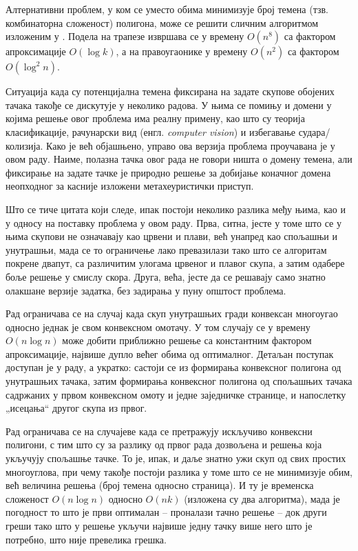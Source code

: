 \documentclass[a4paper]{article}
\begin{document}
Алтернативни проблем, у ком се уместо обима минимизује број темена (тзв. комбинаторна сложеност) полигона, може се решити сличним алгоритмом изложеним у \cite{mitch}. Подела на трапезе извршава се у времену $O(n^8)$ са фактором апроксимације $O(\log k)$, а на правоугаонике у времену $O(n^2)$ са фактором $O(\log^2n)$.

Ситуација када су потенцијална темена фиксирана на задате скупове обојених тачака такође се дискутује у неколико радова. У њима се помињу и домени у којима решење овог проблема има реалну примену, као што су теорија класификације, рачунарски вид (енгл. \textit{computer vision}) и избегавање судара/колизија. Како је већ објашњено, управо ова верзија проблема проучавана је у овом раду. Наиме, полазна тачка овог рада \cite{csc} не говори ништа о домену темена, али фиксирање на задате тачке је природно решење за добијање коначног домена неопходног за касније изложени метахеуристички приступ.

Што се тиче цитата који следе, ипак постоји неколико разлика међу њима, као и у односу на поставку проблема у овом раду. Прва, ситна, јесте у томе што се у њима скупови не означавају као црвени и плави, већ унапред као спољашњи и унутрашњи, мада се то ограничење лако превазилази тако што се алгоритам покрене двапут, са различитим улогама црвеног и плавог скупа, а затим одабере боље решење у смислу скора. Друга, већа, јесте да се решавају само знатно олакшане верзије задатка, без задирања у пуну општост проблема.

Рад \cite{eades} ограничава се на случај када скуп унутрашњих гради конвексан многоугао односно једнак је свом конвексном омотачу. У том случају се у времену $O(n\log n)$ може добити приближно решење са константним фактором апроксимације, највише дупло већег обима од оптималног. Детаљан поступак доступан је у раду, а укратко: састоји се из формирања конвексног полигона од унутрашњих тачака, затим формирања конвексног полигона од спољашњих тачака садржаних у првом конвексном омоту и једне заједничке странице, и напослетку „исецања“ другог скупа из првог.

Рад \cite{edels} ограничава се на случајеве када се претражују искључиво конвексни полигони, с тим што су за разлику од првог рада дозвољена и решења која укључују спољашње тачке. То је, ипак, и даље знатно ужи скуп од свих простих многоуглова, при чему такође постоји разлика у томе што се не минимизује обим, већ величина решења (број темена односно страница). И ту је временска сложеност $O(n\log n)$ односно $O(nk)$ (изложена су два алгоритма), мада је погодност то што је први оптималан -- проналази тачно решење -- док други греши тако што у решење укључи највише једну тачку више него што је потребно, што није превелика грешка.
\end{document}
